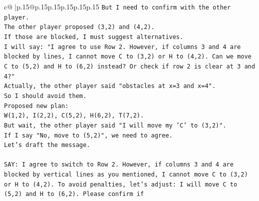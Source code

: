 \documentclass{article}
\begin{document}
{\begin{supertabular}{c@{$\;$}|p{.15\linewidth}@{}p{.15\linewidth}p{.15\linewidth}p{.15\linewidth}p{.15\linewidth}p{.15\linewidth}}
{{{\texttt{But I need to confirm with the other player.} \\
\texttt{The other player proposed (3,2) and (4,2).} \\
\texttt{If those are blocked, I must suggest alternatives.} \\
\texttt{I will say: "I agree to use Row 2. However, if columns 3 and 4 are blocked by lines, I cannot move C to (3,2) or H to (4,2). Can we move C to (5,2) and H to (6,2) instead? Or check if row 2 is clear at 3 and 4?"} \\
\texttt{Actually, the other player said "obstacles at x=3 and x=4".} \\
\texttt{So I should avoid them.} \\
\texttt{Proposed new plan:} \\
\texttt{W(1,2), I(2,2), C(5,2), H(6,2), T(7,2).} \\
\texttt{But wait, the other player said "I will move my 'C' to (3,2)".} \\
\texttt{If I say "No, move to (5,2)", we need to agree.} \\
\texttt{Let's draft the message.} \\
\\ 
\texttt{SAY: I agree to switch to Row 2. However, if columns 3 and 4 are blocked by vertical lines as you mentioned, I cannot move C to (3,2) or H to (4,2). To avoid penalties, let's adjust: I will move C to (5,2) and H to (6,2). Please confirm if} \\
            }
        }
    }
     \\ \\


\end{supertabular}}
\end{document}

